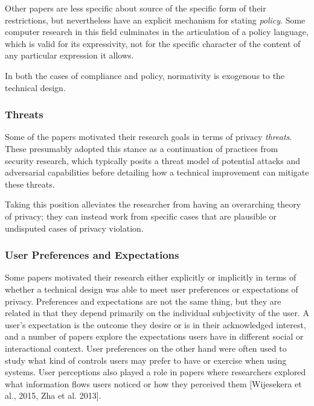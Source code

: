 \documentclass[../thesis.tex]{subfiles}
\begin{document}
Other papers are less specific about source of the specific form of
their restrictions, but nevertheless have an explicit mechanism for
stating \textit{policy}. Some computer research in this field
culminates in the articulation of a policy language, which is valid for
its expressivity, not for the specific character of the content of any
particular expression it allows.

In both the cases of compliance and policy, normativity is exogenous to
the technical design. 

\subsubsection{Threats}
\label{CI4.3.2}

Some of the papers motivated their research goals in terms of privacy
\textit{threats}. These presumably adopted this stance as a
continuation of practices from security research, which typically
posits a threat model of potential attacks and adversarial capabilities
before detailing how a technical improvement can mitigate these
threats.

Taking this position alleviates the researcher from having an
overarching theory of privacy; they can instead work from specific
cases that are plausible or undisputed cases of privacy violation.

\subsubsection{User Preferences and Expectations}
\label{CI4.3.3}

\bigskip

Some papers motivated their research either explicitly or implicitly in
terms of whether a technical design was able to meet user preferences
or expectations of privacy. Preferences and expectations are not the
same thing, but they are related in that they depend primarily on the
individual subjectivity of the user. A user's
expectation is the outcome they desire or is in their acknowledged
interest, and a number of papers explore the expectations users have in
different social or interactional context. User preferences on the
other hand were often used to study what kind of controls users may
prefer to have or exercise when using systems. User perceptions also
played a role in papers where researchers explored what information
flows users noticed or how they perceived them [Wijesekera et al.,
2015, Zha et al. 2013].
\end{document}
